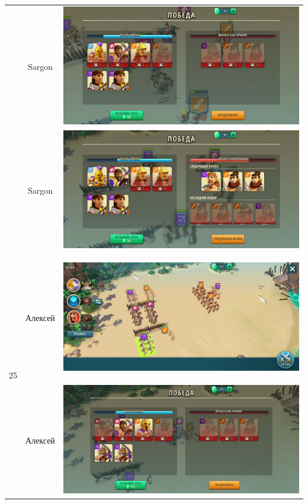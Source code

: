 \begin{longtable}{|c|c|c|}
	& Sargon &
	\includegraphics[width=0.75\linewidth]{./parts/media/TreasureHunt/25/sargon/photo_2022-04-07_09-58-35.jpg} \\
	& Sargon &
	\includegraphics[width=0.75\linewidth]{./parts/media/TreasureHunt/25/sargon/photo_2022-04-07_09-58-27.jpg} \\
	\hline
	\multirow{11}{*}{25} & Алексей &
	\hypertarget{fight25}{\includegraphics[width=0.75\linewidth]{./parts/media/TreasureHunt/25/alexey/photo_2022-04-07_10-09-19.jpg}} \\
	& Алексей &
	\includegraphics[width=0.75\linewidth]{./parts/media/TreasureHunt/25/alexey/photo_2022-04-07_10-09-24.jpg} \\

\end{longtable}
